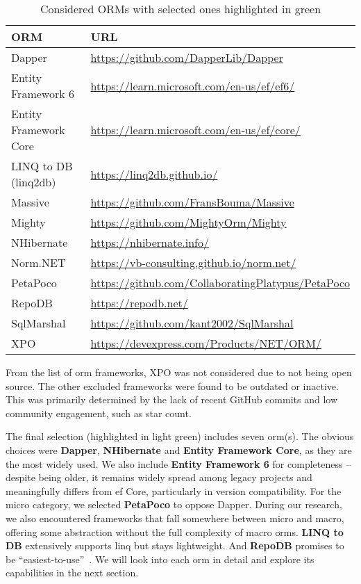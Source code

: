 \begin{table}[ht!]
\footnotesize
\def\arraystretch{1.25}
\centering
\begin{tabular}{ll}
\toprule
\textbf{ORM} & \textbf{URL} \\
\midrule
\cellcolor{lightgreen}Dapper & \url{https://github.com/DapperLib/Dapper} \\
\cellcolor{lightgreen}Entity Framework 6 & \url{https://learn.microsoft.com/en-us/ef/ef6/} \\
\cellcolor{lightgreen}Entity Framework Core & \url{https://learn.microsoft.com/en-us/ef/core/} \\
\cellcolor{lightgreen}LINQ to DB (linq2db) & \url{https://linq2db.github.io/} \\
Massive & \url{https://github.com/FransBouma/Massive} \\
Mighty & \url{https://github.com/MightyOrm/Mighty} \\
\cellcolor{lightgreen}NHibernate & \url{https://nhibernate.info/} \\
Norm.NET & \url{https://vb-consulting.github.io/norm.net/} \\
\cellcolor{lightgreen}PetaPoco & \url{https://github.com/CollaboratingPlatypus/PetaPoco} \\
\cellcolor{lightgreen}RepoDB & \url{https://repodb.net/} \\
SqlMarshal & \url{https://github.com/kant2002/SqlMarshal} \\
XPO & \url{https://devexpress.com/Products/NET/ORM/} \\
\bottomrule
\end{tabular}
\caption{Considered ORMs with selected ones highlighted in green\label{tab:orm-docs}}
\end{table}

From the list of \acrshort{orm} frameworks, XPO was not considered due to not being open source. The other excluded frameworks were found to be outdated or inactive. This was primarily determined by the lack of recent GitHub commits and low community engagement, such as star count. 

The final selection (highlighted in light green) includes seven \acrshort{orm}(s). The obvious choices were \textbf{Dapper}, \textbf{NHibernate} and \textbf{Entity Framework Core}, as they are the most widely used. We also include \textbf{Entity Framework 6} for completeness -- despite being older, it remains widely spread among legacy projects and meaningfully differs from \acrshort{ef} Core, particularly in version compatibility. For the micro category, we selected \textbf{PetaPoco} to oppose Dapper. During our research, we also encountered frameworks that fall somewhere between micro and macro, offering some abstraction without the full complexity of macro \acrshort{orm}s. \textbf{LINQ to DB} extensively supports \acrshort{linq} but stays lightweight. And \textbf{RepoDB} promises to be ``easiest-to-use''~\cite{RepoDB}. We will look into each \acrshort{orm} in detail and explore its capabilities in the next section.